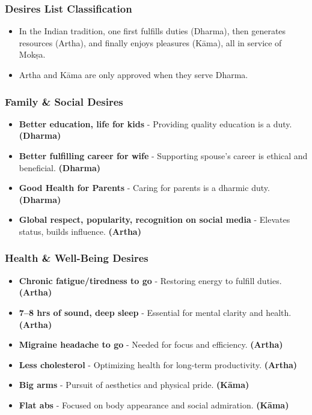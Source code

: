 \begin{frame}[fragile]\frametitle{Desires List Classification}
      \begin{itemize}
        \item In the Indian tradition, one first fulfills duties (Dharma), then generates resources (Artha), and finally enjoys pleasures (Kāma), all in service of Mokṣa.
        \item Artha and Kāma are only approved when they serve Dharma.
      \end{itemize}
\end{frame}

\begin{frame}[fragile]\frametitle{Family \& Social Desires}
      \begin{itemize}
        \item \textbf{Better education, life for kids} - Providing quality education is a duty. \textbf{(Dharma)}
        \item \textbf{Better fulfilling career for wife} - Supporting spouse’s career is ethical and beneficial. \textbf{(Dharma)}
        \item \textbf{Good Health for Parents} - Caring for parents is a dharmic duty. \textbf{(Dharma)}
        \item \textbf{Global respect, popularity, recognition on social media} - Elevates status, builds influence. \textbf{(Artha)}
      \end{itemize}
\end{frame}

\begin{frame}[fragile]\frametitle{Health \& Well-Being Desires}
      \begin{itemize}
        \item \textbf{Chronic fatigue/tiredness to go} - Restoring energy to fulfill duties. \textbf{(Artha)}
        \item \textbf{7–8 hrs of sound, deep sleep} - Essential for mental clarity and health. \textbf{(Artha)}
        \item \textbf{Migraine headache to go} - Needed for focus and efficiency. \textbf{(Artha)}
        \item \textbf{Less cholesterol} - Optimizing health for long-term productivity. \textbf{(Artha)}
        \item \textbf{Big arms} - Pursuit of aesthetics and physical pride. \textbf{(Kāma)}
        \item \textbf{Flat abs} - Focused on body appearance and social admiration. \textbf{(Kāma)}
      \end{itemize}
\end{frame}

